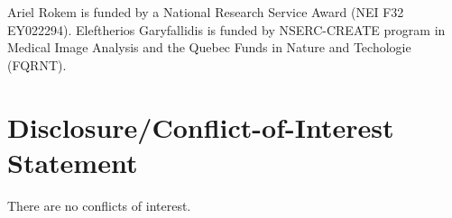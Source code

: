 \documentclass{bioinfo}
\begin{document}
Ariel Rokem is funded by a National Research Service Award (NEI F32 EY022294).
Eleftherios Garyfallidis is funded by NSERC-CREATE program in Medical
Image Analysis and the Quebec Funds in Nature and Techologie (FQRNT).

\section*{Disclosure/Conflict-of-Interest Statement}
There are no conflicts of interest.



%

%
%
%
%

\end{document}
